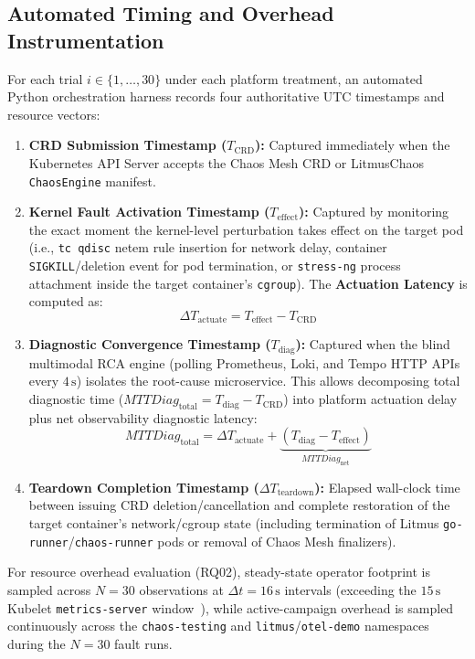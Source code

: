 \subsection{Automated Timing and Overhead Instrumentation}
For each trial $i \in \{1, \dots, 30\}$ under each platform treatment, an automated Python orchestration harness records four authoritative UTC timestamps and resource vectors:
\begin{enumerate}
    \item \textbf{CRD Submission Timestamp ($T_{\text{CRD}}$):} Captured immediately when the Kubernetes API Server accepts the Chaos Mesh CRD or LitmusChaos \texttt{ChaosEngine} manifest.
    \item \textbf{Kernel Fault Activation Timestamp ($T_{\text{effect}}$):} Captured by monitoring the exact moment the kernel-level perturbation takes effect on the target pod (i.e., \texttt{tc qdisc} netem rule insertion for network delay, container \texttt{SIGKILL}/deletion event for pod termination, or \texttt{stress-ng} process attachment inside the target container's \texttt{cgroup}). The \textbf{Actuation Latency} is computed as:
    \begin{equation}
        \Delta T_{\text{actuate}} = T_{\text{effect}} - T_{\text{CRD}}
    \end{equation}
    \item \textbf{Diagnostic Convergence Timestamp ($T_{\text{diag}}$):} Captured when the blind multimodal RCA engine (polling Prometheus, Loki, and Tempo HTTP APIs every $4\,\text{s}$) isolates the root-cause microservice. This allows decomposing total diagnostic time ($MTTDiag_{\text{total}} = T_{\text{diag}} - T_{\text{CRD}}$) into platform actuation delay plus net observability diagnostic latency:
    \begin{equation}
        MTTDiag_{\text{total}} = \Delta T_{\text{actuate}} + \underbrace{(T_{\text{diag}} - T_{\text{effect}})}_{MTTDiag_{\text{net}}}
    \end{equation}
    \item \textbf{Teardown Completion Timestamp ($\Delta T_{\text{teardown}}$):} Elapsed wall-clock time between issuing CRD deletion/cancellation and complete restoration of the target container's network/cgroup state (including termination of Litmus \texttt{go-runner}/\texttt{chaos-runner} pods or removal of Chaos Mesh finalizers).
\end{enumerate}

For resource overhead evaluation (RQ02), steady-state operator footprint is sampled across $N=30$ observations at $\Delta t = 16\,\text{s}$ intervals (exceeding the $15\,\text{s}$ Kubelet \texttt{metrics-server} window~\cite{hurlbert_1984}), while active-campaign overhead is sampled continuously across the \texttt{chaos-testing} and \texttt{litmus}/\texttt{otel-demo} namespaces during the $N=30$ fault runs.
